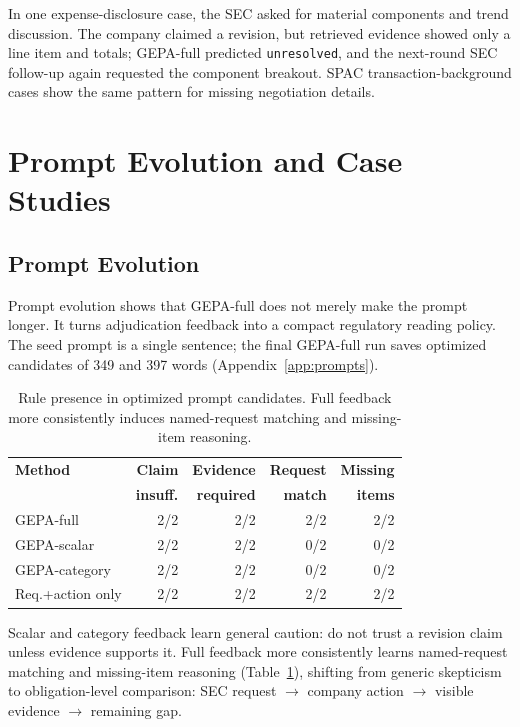 \documentclass[11pt]{article}
\begin{document}
In one expense-disclosure case, the SEC asked for material components and trend discussion. The company claimed a revision, but retrieved evidence showed only a line item and totals; GEPA-full predicted \texttt{unresolved}, and the next-round SEC follow-up again requested the component breakout. SPAC transaction-background cases show the same pattern for missing negotiation details.

\section{Prompt Evolution and Case Studies}

\subsection{Prompt Evolution}

Prompt evolution shows that GEPA-full does not merely make the prompt longer. It turns adjudication feedback into a compact regulatory reading policy. The seed prompt is a single sentence; the final GEPA-full run saves optimized candidates of 349 and 397 words (Appendix~\ref{app:prompts}).

\begin{table}[t]
\centering
\scriptsize
\setlength{\tabcolsep}{3pt}
\begin{tabular}{lrrrr}
\toprule
\textbf{Method} & \textbf{Claim} & \textbf{Evidence} & \textbf{Request} & \textbf{Missing} \\
 & \textbf{insuff.} & \textbf{required} & \textbf{match} & \textbf{items} \\
\midrule
GEPA-full & 2/2 & 2/2 & 2/2 & 2/2 \\
GEPA-scalar & 2/2 & 2/2 & 0/2 & 0/2 \\
GEPA-category & 2/2 & 2/2 & 0/2 & 0/2 \\
Req.+action only & 2/2 & 2/2 & 2/2 & 2/2 \\
\bottomrule
\end{tabular}
\caption{Rule presence in optimized prompt candidates. Full feedback more consistently induces named-request matching and missing-item reasoning.}
\label{tab:prompt}
\end{table}

Scalar and category feedback learn general caution: do not trust a revision claim unless evidence supports it. Full feedback more consistently learns named-request matching and missing-item reasoning (Table~\ref{tab:prompt}), shifting from generic skepticism to obligation-level comparison: SEC request $\rightarrow$ company action $\rightarrow$ visible evidence $\rightarrow$ remaining gap.
\end{document}
